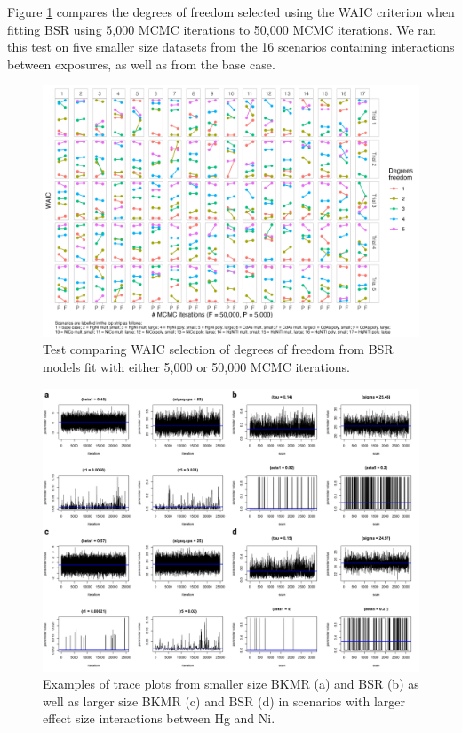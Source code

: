 \documentclass[12pt, twoside]{amherstthesis}
\begin{document}
Figure \ref{fig:comparedf} compares the degrees of freedom selected using the WAIC criterion when fitting BSR using 5,000 MCMC iterations to 50,000 MCMC iterations. We ran this test on five smaller size datasets from the 16 scenarios containing interactions between exposures, as well as from the base case.
\begin{figure}

{\centering \includegraphics[width=1\linewidth]{figures/test_waic2} 

}

\caption{Test comparing WAIC selection of degrees of freedom from BSR models fit with either 5,000 or 50,000 MCMC iterations.}\label{fig:comparedf}
\end{figure}
\begin{figure}

{\centering \includegraphics[width=1\linewidth]{figures/traceplots/bksm_traceplotmerged} 

}

\caption{Examples of trace plots from smaller size BKMR (a) and BSR (b) as well as larger size BKMR (c) and BSR (d) in scenarios with larger effect size interactions between Hg and Ni.}\label{fig:traceplots}
\end{figure}
\end{document}
